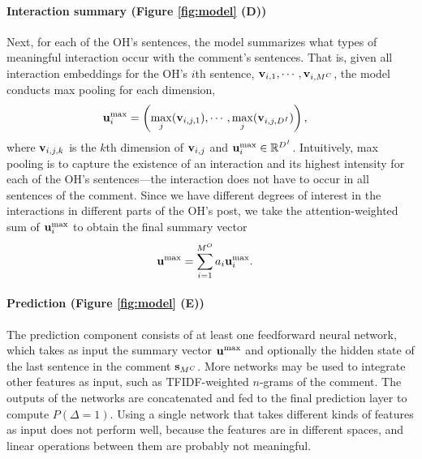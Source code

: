 \documentclass[11pt,a4paper]{article}
\newif\ifcomments
\newcommand{\gn}[1]{\ifcomments\textcolor{red}{\bf\small [#1 --GN]}\else\fi}
\newcommand{\highlight}[1]{%
  \begingroup
  \definecolor{hlcolor}{RGB}{240,255,0}\sethlcolor{hlcolor}%
  \hl{#1}%
  \endgroup
}
\begin{document}
\paragraph{Interaction summary (Figure \ref{fig:model} (D))} Next, for each of the OH's sentences, the model summarizes what types of meaningful interaction occur with the comment's sentences. That is, given all interaction embeddings for the OH's $i$th sentence, $\mathbf{v}_{i,1}, \cdots, \mathbf{v}_{i,M^C}$, the model conducts max pooling for each dimension,
\begin{align*}
\mathbf{u}^{\rm{max}}_i &= \left( \max_j(\mathbf{v}_{i,j,1}), \cdots, \max_j(\mathbf{v}_{i,j,D^{I}}) \right), 
\end{align*}
where $\mathbf{v}_{i,j,k}$ is the $k$th dimension of $\mathbf{v}_{i,j}$ and $\mathbf{u}^{\rm{max}}_i \in \mathbb{R}^{D^{I}}$. 
Intuitively, max pooling is to capture the existence of an interaction and its highest intensity for each of the OH's sentences---the interaction does not have to occur in all sentences of the comment. 
Since we have different degrees of interest in the interactions in different parts of the OH's post, we take the attention-weighted sum of $\mathbf{u}^{\rm{max}}_i$ to obtain the final summary vector
\begin{align*}
\mathbf{u}^{\rm{max}} &= \sum_{i = 1}^{M^{O}} a_i \mathbf{u}^{\rm{max}}_i.
\end{align*}

\paragraph{Prediction (Figure \ref{fig:model} (E))} The prediction component consists of at least one feedforward neural network, which takes as input the summary vector $\mathbf{u}^{\rm{max}}$ and optionally the hidden state of the last sentence in the comment $\mathbf{s}_{M^C}$. 
More networks may be used to integrate other features as input, such as TFIDF-weighted $n$-grams of the comment. 
The outputs of the networks are concatenated and fed to the final prediction layer to compute $P(\Delta = 1)$. 
Using a single network that takes different kinds of features as input does not perform well, because the features are in different spaces, and linear operations between them are probably not meaningful.
\end{document}
